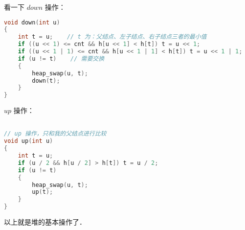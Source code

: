 看一下 $down$ 操作：

\begin{lstlisting}[language=cpp]
void down(int u)
{
    int t = u;    // t 为：父结点、左子结点、右子结点三者的最小值
    if ((u << 1) <= cnt && h[u << 1] < h[t]) t = u << 1;
    if ((u << 1 | 1) <= cnt && h[u << 1 | 1] < h[t]) t = u << 1 | 1;
    if (u != t)    // 需要交换
    {
        heap_swap(u, t);
        down(t);
    }
}
\end{lstlisting}

$up$ 操作：

\begin{lstlisting}[language=cpp]

// up 操作，只和我的父结点进行比较
void up(int u)
{
    int t = u;
    if (u / 2 && h[u / 2] > h[t]) t = u / 2;
    if (u != t)
    {
        heap_swap(u, t);
        up(t);
    }
}
\end{lstlisting}

以上就是堆的基本操作了．